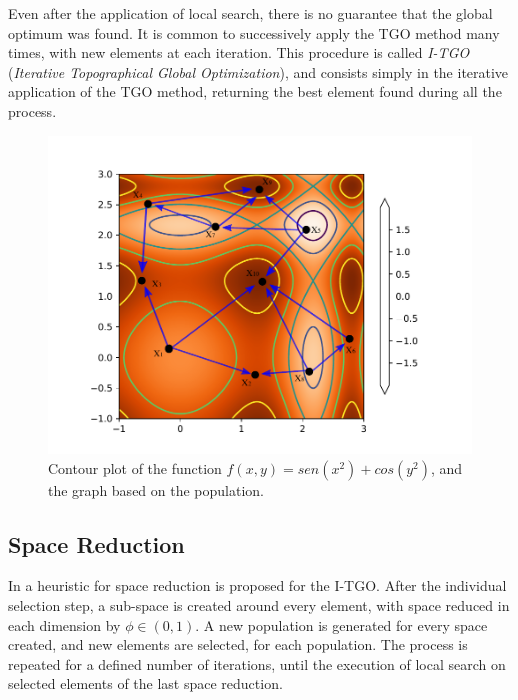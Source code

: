 Even after the application of local search, there is no guarantee that the global optimum was found. It is common to successively apply the TGO method many times, with new elements at each iteration. This procedure is called \textit{I-TGO} (\textit{Iterative Topographical Global Optimization}), and consists simply in the iterative application of the TGO method, returning the best element found during all the process.



\begin{figure}[tp]
\begin{center}
\includegraphics[scale=0.6]{fig_1.pdf}
\end{center}
\captionsetup{justification=centering}
\vspace*{-7mm} 
\caption{Contour plot of the function $f(x, y) = sen(x^2) + cos(y^2)$, and the graph based on the population.}\label{fig:Graph}
\end{figure}


\subsection{Space Reduction}

In \cite{ITGO4} a heuristic for space reduction is proposed for the I-TGO. After the individual selection step, a sub-space is created around every element, with space reduced in each dimension by $\phi \in (0, 1)$. A new population is generated for every space created, and new elements are selected, for each population. The process is repeated for a defined number of iterations, until the execution of local search on selected elements of the last space reduction.

